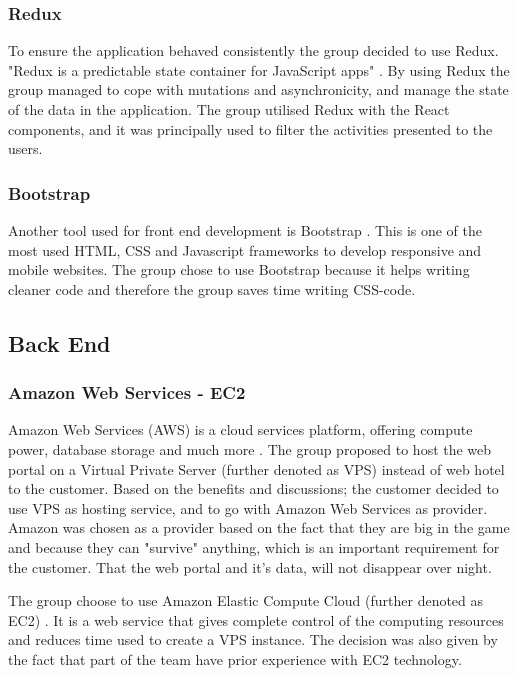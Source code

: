 \subsubsection{Redux}
\label{redux}
To ensure the application behaved consistently the group decided to use Redux. "Redux is a predictable state container for JavaScript apps" \cite{Redux}. By using Redux the group managed to cope with mutations and asynchronicity, and manage the state of the data in the application. The group utilised Redux with the React components, and it was principally used to filter the activities presented to the users.  

\subsubsection{Bootstrap}
Another tool used for front end development is Bootstrap \cite{Bootstrap}. This is one of the most used HTML, CSS and Javascript frameworks to develop responsive and mobile websites. The group chose to use Bootstrap because it helps writing cleaner code and therefore the group  saves time writing CSS-code. 

\subsection{Back End}
\subsubsection{Amazon Web Services - EC2}
Amazon Web Services (AWS) is a cloud services platform, offering compute power, database storage and much more \cite{AWS}. The group proposed to host the web portal on a Virtual Private Server (further denoted as VPS) instead of web hotel to the customer. Based on the benefits and discussions; the customer decided to use VPS as hosting service, and to go with Amazon Web Services as provider. Amazon was chosen as a provider based on the fact that they are big in the game and because they can "survive" anything, which is an important requirement for the customer. That the web portal and it's data, will not disappear over night. 

The group choose to use Amazon Elastic Compute Cloud (further denoted as EC2) \cite{EC2}. It is a web service that gives complete control of the computing resources and reduces time used to create a VPS instance. The decision was also given by the fact that part of the team have prior experience with EC2 technology. 


